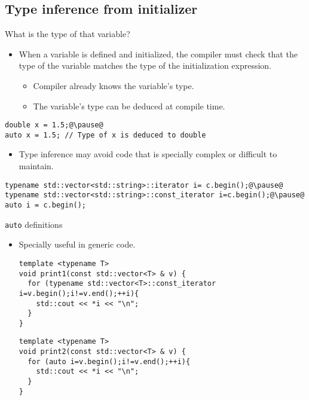 \subsection{Type inference from initializer}

\begin{frame}[t,fragile]{What is the type of that variable?}
  \begin{itemize}
    \item When a variable is defined and initialized, 
          the compiler must check that the type of the variable
          matches the type of the initialization expression.
      \begin{itemize}
        \item Compiler already knows the variable's type.
        \item The variable's type can be deduced at compile time.
      \end{itemize}
  \end{itemize}
\pause
\begin{lstlisting}[escapechar=@]
double x = 1.5;@\pause@
auto x = 1.5; // Type of x is deduced to double
\end{lstlisting}
\pause
  \begin{itemize}
    \item Type inference may avoid code that is specially 
       complex or difficult to maintain.
  \end{itemize}
\pause
\begin{lstlisting}[escapechar=@]
typename std::vector<std::string>::iterator i= c.begin();@\pause@
typename std::vector<std::string>::const_iterator i=c.begin();@\pause@
auto i = c.begin();
\end{lstlisting}
\end{frame}

\begin{frame}[t,fragile]{\texttt{auto} definitions}
\begin{itemize}
\item Specially useful in generic code.
\begin{lstlisting}
template <typename T>
void print1(const std::vector<T> & v) {
  for (typename std::vector<T>::const_iterator i=v.begin();i!=v.end();++i){
    std::cout << *i << "\n";
  }
}
\end{lstlisting}
\begin{lstlisting}
template <typename T>
void print2(const std::vector<T> & v) {
  for (auto i=v.begin();i!=v.end();++i){
    std::cout << *i << "\n";
  }
}
\end{lstlisting}
\end{itemize}
\end{frame}

